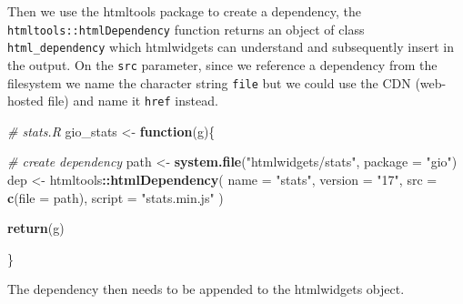 \documentclass[
  10pt,
]{krantz}
\makeatletter
\newenvironment{Shaded}{\begin{snugshade}}{\end{snugshade}}
\newcommand{\CommentTok}[1]{\textcolor[rgb]{0.37,0.37,0.37}{\textit{#1}}}
\newcommand{\ControlFlowTok}[1]{\textcolor[rgb]{0.27,0.27,0.27}{\textbf{#1}}}
\newcommand{\DataTypeTok}[1]{\textcolor[rgb]{0.27,0.27,0.27}{#1}}
\newcommand{\KeywordTok}[1]{\textcolor[rgb]{0.27,0.27,0.27}{\textbf{#1}}}
\newcommand{\NormalTok}[1]{#1}
\newcommand{\OperatorTok}[1]{\textcolor[rgb]{0.43,0.43,0.43}{\textbf{#1}}}
\newcommand{\StringTok}[1]{\textcolor[rgb]{0.5,0.5,0.5}{#1}}
\newenvironment{kframe}{%
\medskip{}
\setlength{\fboxsep}{.8em}
 \def\at@end@of@kframe{}%
 \ifinner\ifhmode%
  \def\at@end@of@kframe{\end{minipage}}%
  \begin{minipage}{\columnwidth}%
 \fi\fi%
 \def\FrameCommand##1{\hskip\@totalleftmargin \hskip-\fboxsep
 \colorbox{shadecolor}{##1}\hskip-\fboxsep
     \hskip-\linewidth \hskip-\@totalleftmargin \hskip\columnwidth}%
 \MakeFramed {\advance\hsize-\width
   \@totalleftmargin\z@ \linewidth\hsize
   \@setminipage}}%
 {\par\unskip\endMakeFramed%
 \at@end@of@kframe}
\renewenvironment{Shaded}{\begin{kframe}}{\end{kframe}}
\makeatother
\begin{document}
Then we use the htmltools package to create a dependency, the \texttt{htmltools::htmlDependency} function returns an object of class \texttt{html\_dependency} which htmlwidgets can understand and subsequently insert in the output. On the \texttt{src} parameter, since we reference a dependency from the filesystem we name the character string \texttt{file} but we could use the CDN (web-hosted file) and name it \texttt{href} instead.

\begin{Shaded}
\begin{Highlighting}[]
\CommentTok{\# stats.R}
\NormalTok{gio\_stats <{-}}\StringTok{ }\ControlFlowTok{function}\NormalTok{(g)\{}

  \CommentTok{\# create dependency}
\NormalTok{  path <{-}}\StringTok{ }\KeywordTok{system.file}\NormalTok{(}\StringTok{"htmlwidgets/stats"}\NormalTok{, }\DataTypeTok{package =} \StringTok{"gio"}\NormalTok{)}
\NormalTok{  dep <{-}}\StringTok{ }\NormalTok{htmltools}\OperatorTok{::}\KeywordTok{htmlDependency}\NormalTok{(}
    \DataTypeTok{name =} \StringTok{"stats"}\NormalTok{,}
    \DataTypeTok{version =} \StringTok{"17"}\NormalTok{,}
    \DataTypeTok{src =} \KeywordTok{c}\NormalTok{(}\DataTypeTok{file =}\NormalTok{ path),}
    \DataTypeTok{script =} \StringTok{"stats.min.js"}
\NormalTok{  )}

  \KeywordTok{return}\NormalTok{(g)}

\NormalTok{\}}
\end{Highlighting}
\end{Shaded}

The dependency then needs to be appended to the htmlwidgets object.

\begin{Shaded}
\end{Shaded}
\end{document}
